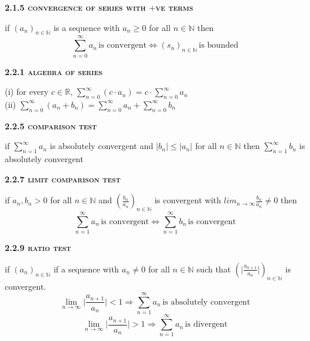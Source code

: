 \documentclass[a4paper]{article}
\begin{document}
\begin{multicols}{2}
\begin{framed}
	\begin{center}
		\textbf{\textsc{2.1.5 convergence of series with $+$ve terms}}
	\end{center}
	if $(a_n)_{n \in \mathbb{N}}$ is a sequence with $a_n \geq 0$ for all $n \in \mathbb{N}$ then
	$$\sum^\infty_{n=0} a_n \, \text{is convergent} \iff (s_n)_{n \in \mathbb{N}} \, \text{is bounded}$$
\end{framed}

\begin{framed}
	\begin{center}
		\textbf{\textsc{2.2.1 algebra of series}}
	\end{center}
	(i) for every $c \in \mathbb{R}$, $\sum^\infty_{n=0} (c \cdot a_n) = c \cdot \sum^\infty_{n=0} a_n$\\
	(ii) $\sum^\infty_{n=0} (a_n + b_n) = \sum^\infty_{n=0} a_n + \sum^\infty_{n=0} b_n$
\end{framed}

\begin{framed}
	\begin{center}
		\textbf{\textsc{2.2.5 comparison test}}
	\end{center}
	if $\sum_{n=1}^\infty a_n$ is absolutely convergent and $\vert b_n \vert \leq \vert a_n \vert$ for all $n \in \mathbb{N}$ then $\sum_{n=1}^\infty b_n$ is absolutely convergent
\end{framed}

\begin{framed}
	\begin{center}
		\textbf{\textsc{2.2.7 limit comparison test}}
	\end{center}
	if $a_n, b_n > 0$ for all $n \in \mathbb{N}$ and $(\frac{b_n}{a_n})_{n \in \mathbb{N}}$ is convergent with $lim_{n \rightarrow \infty}\frac{b_n}{a_n} \neq 0$ then
	$$ \sum^\infty_{n=1} a_n \, \text{is convergent} \iff \sum^\infty_{n=1} b_n \, \text{is convergent}$$
\end{framed}

\begin{framed}
	\begin{center}
		\textbf{\textsc{2.2.9 ratio test}}
	\end{center}
	if $(a_n)_{n \in \mathbb{N}}$ if a sequence with $a_n \neq 0$ for all $n \in \mathbb{N}$ such that $(\vert \frac{a_{n+1}}{a_n} \vert)_{n \in \mathbb{N}}$ is convergent.
	$$\lim_{n \rightarrow \infty} \vert \frac{a_{n+1}}{a_n} \vert < 1 \Rightarrow \sum_{n=1}^\infty a_n \, \text{is absolutely convergent}$$
	$$\lim_{n \rightarrow \infty} \vert \frac{a_{n+1}}{a_n} \vert > 1 \Rightarrow \sum_{n=1}^\infty a_n \, \text{is divergent}$$
\end{framed}


\end{multicols}
\end{document}
